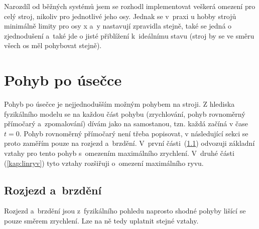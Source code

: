 	Narozdíl od běžných systémů jsem se rozhodl implementovat veškerá omezení pro celý stroj, nikoliv pro jednotlivé jeho osy. Jednak se v~praxi u hobby strojů minimálně limity pro osy x a~y nastavují zpravidla stejně, také se jedná o zjednodušení a~také jde o jisté přiblížení k~ideálnímu stavu (stroj by se ve směru všech os měl pohybovat stejně).
	
	\section{Pohyb po úsečce}\label{kap:pohybpousecce}
	Pohyb po úsečce je nejjednodušším možným pohybem na stroji.	Z hlediska fyzikálního modelu se na každou část pohybu (zrychlování, pohyb rovnoměrný přímočarý a~zpomalování) dívám jako na samostanou, tzn. každá začíná v čase $t=0$. Pohyb rovnoměrný přímočarý není třeba popisovat, v následující sekci se proto zaměřím pouze na rozjezd a~brzdění. V~první části~(\ref{kap:linrozbrzd}) odvozuji základní vztahy pro tento pohyb s~omezením maximálního zrychlení. V~druhé části (\ref{kap:linryv}) tyto vztahy rozšiřuji o~omezení maximálního ryvu.
	
		\subsection{Rozjezd a~brzdění}\label{kap:linrozbrzd}
		
		Rozjezd a~brzdění jsou z~fyzikálního pohledu naprosto shodné pohyby lišící se pouze směrem zrychlení. Lze na ně tedy uplatnit stejné vztahy.
		
